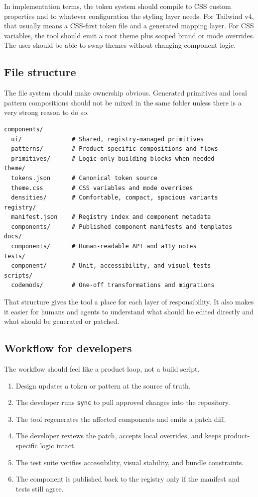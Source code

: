 \documentclass[11pt,twoside,a4paper]{article}
\begin{document}
In implementation terms, the token system should compile to CSS custom properties and to whatever configuration the styling layer needs. For Tailwind v4, that usually means a CSS-first token file and a generated mapping layer. For CSS variables, the tool should emit a root theme plus scoped brand or mode overrides. The user should be able to swap themes without changing component logic.

\subsection{File structure}
The file system should make ownership obvious. Generated primitives and local pattern compositions should not be mixed in the same folder unless there is a very strong reason to do so.

\begin{verbatim}
components/
  ui/              # Shared, registry-managed primitives
  patterns/        # Product-specific compositions and flows
  primitives/      # Logic-only building blocks when needed
theme/
  tokens.json      # Canonical token source
  theme.css        # CSS variables and mode overrides
  densities/       # Comfortable, compact, spacious variants
registry/
  manifest.json    # Registry index and component metadata
  components/      # Published component manifests and templates
docs/
  components/      # Human-readable API and a11y notes
tests/
  component/       # Unit, accessibility, and visual tests
scripts/
  codemods/        # One-off transformations and migrations
\end{verbatim}

That structure gives the tool a place for each layer of responsibility. It also makes it easier for humans and agents to understand what should be edited directly and what should be generated or patched.

\subsection{Workflow for developers}
The workflow should feel like a product loop, not a build script.

\begin{enumerate}[leftmargin=*, itemsep=0.45em]
  \item Design updates a token or pattern at the source of truth.
  \item The developer runs \texttt{sync} to pull approved changes into the repository.
  \item The tool regenerates the affected components and emits a patch diff.
  \item The developer reviews the patch, accepts local overrides, and keeps product-specific logic intact.
  \item The test suite verifies accessibility, visual stability, and bundle constraints.
  \item The component is published back to the registry only if the manifest and tests still agree.
\end{enumerate}
\end{document}
